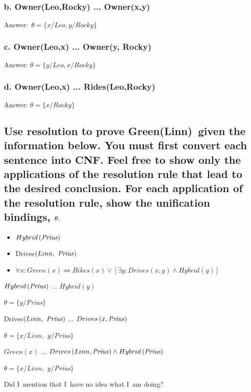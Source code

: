 \documentclass{article}
\begin{document}
\subsubsection{b. Owner(Leo,Rocky) ... Owner(x,y)}

Answer:\ $\theta =\{x/Leo,y/Rocky\}$

\subsubsection{c. Owner(Leo,x) ... Owner(y, Rocky)}

Answer: $\theta =\{y/Leo,x/Rocky\}$

\subsubsection{d. Owner(Leo,x) ... Rides(Leo,Rocky)}

Answer: $\theta =\{x/Rocky\}$

\subsection{Use resolution to prove Green(Linn)\ given the information
below. You must first convert each sentence into CNF. Feel free to show only
the applications of the resolution rule that lead to the desired conclusion.
For each application of the resolution rule, show the unification bindings, $%
\protect\theta .$}

\begin{itemize}
\item $Hybrid\left( \text{\textit{Prius}}\right) $

\item Drives$\left( Linn,\text{ \textit{Prius}}\right) $

\item $\forall x:Green\left( x\right) \Leftrightarrow Bikes\left( x\right)
\vee \left[ \exists y:Drives\left( x,y\right) \wedge Hybrid\left( y\right) %
\right] $
\end{itemize}

$Hybrid\left( \text{\textit{Prius}}\right) $ ... $Hybrid\left( y\right) $

$\theta =\{y/$\textit{Prius}$\}$

Drives$\left( Linn,\text{ \textit{Prius}}\right) $ ... $Drives\left( x,\text{%
\textit{Prius}}\right) $

$\theta =\{x/Linn,$ $y/$\textit{Prius}$\}$

$Green\left( x\right) $ ... $Drives\left( Linn,\text{\textit{Prius}}\right)
\wedge Hybrid\left( \text{\textit{Prius}}\right) $

$\theta =\{x/Linn,$ $y/$\textit{Prius}$\}$

Did I\ mention that I\ have no idea what I\ am doing? 
\end{document}
